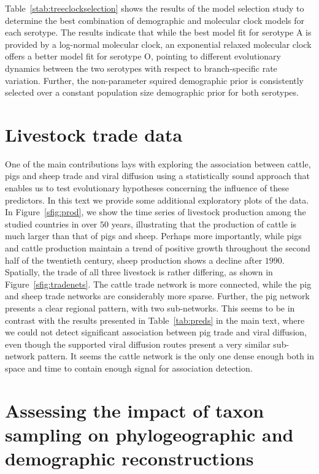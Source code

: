 \documentclass[a4paper,10pt]{article}
\begin{document}
Table~\ref{stab:treeclockselection} shows the results of the model selection study to determine the best combination of demographic and molecular clock models for each serotype.
The results indicate that while the best model fit for serotype A is provided by a log-normal molecular clock, an exponential relaxed molecular clock offers a better model fit for serotype O, pointing to different evolutionary dynamics between the two serotypes with respect to branch-specific rate variation. 
Further, the non-parameter squired demographic prior is consistently selected over a constant population size demographic prior for both serotypes. 


\section*{Livestock trade data}

One of the main contributions lays with exploring the association between cattle, pigs and sheep trade and viral diffusion using a statistically sound approach that enables us to test evolutionary hypotheses concerning the influence of these predictors.
In this text we provide some additional exploratory plots of the data.
In Figure~\ref{sfig:prod}, we show the time series of livestock production among the studied countries in over $50$ years, illustrating that the production of cattle is much larger than that of pigs and sheep.
Perhaps more importantly, while pigs and cattle production maintain a trend of positive growth throughout the second half of the twentieth century, sheep production shows a decline after $1990$.
Spatially, the trade of all three livestock is rather differing, as shown in Figure~\ref{sfig:tradenets}.
The cattle trade network is more connected, while the pig and sheep trade networks are considerably more sparse.
Further, the pig network presents a clear regional pattern, with two sub-networks.
This seems to be in contrast with the results presented in Table~\ref{tab:preds} in the main text, where we could not detect significant association between pig trade and viral diffusion, even though the supported viral diffusion routes present a very similar sub-network pattern.
It seems the cattle network is the only one dense enough both in space and time to contain enough signal for association detection.

\section*{Assessing the impact of taxon sampling on phylogeographic and demographic reconstructions}
\end{document}

